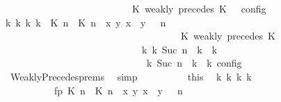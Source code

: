 \begin{isabellebody}
\ \ \ \ \ \ \ \ \ \ \ \ \ \ \ \ \ \ \ \ \ \ \ \ {\isasymturnstile}\ {\isasymPsi}\ {\isasymtriangleright}\ {\isacharparenleft}{\isacharparenleft}K\ weakly\ precedes\ K\ {\isacharhash}\ {\isasymPhi}{\isacharparenright}\ {\isasymrbrakk}\isactrlsub c\isactrlsub o\isactrlsub n\isactrlsub f\isactrlsub i\isactrlsub g{\isacartoucheclose}\isanewline
\ \ \ \ \ \ \ \ \isamarkupfalse%
\ {\isacartoucheopen}{\isasymexists}{\isasymGamma}\isactrlsub k\ {\isasymPsi}\isactrlsub k\ {\isasymPhi}\isactrlsub k\ k{\isachardot}\ {\isacharparenleft}{\isacharparenleft}{\isacharparenleft}{\isacharparenleft}{\isasymlceil}{\isacharhash}\isactrlsup {\isasymle}\ K\ n{\isacharcomma}\ {\isacharhash}\isactrlsup {\isasymle}\ K\ n{\isasymrceil}\ {\isasymin}\ {\isacharparenleft}{\isasymlambda}{\isacharparenleft}x{\isacharcomma}\ y{\isacharparenright}{\isachardot}\ x\ {\isasymle}\ y{\isacharparenright}{\isacharparenright}\ {\isacharhash}\ {\isasymGamma}{\isacharparenright}{\isacharcomma}\ n\isanewline
\ \ \ \ \ \ \ \ \ \ \ \ \ \ \ \ \ \ \ \ \ \ \ \ \ \ \ \ \ \ \ \ \ \ {\isasymturnstile}\ {\isasymPsi}\ {\isasymtriangleright}\ {\isacharparenleft}{\isacharparenleft}K\ weakly\ precedes\ K\ {\isacharhash}\ {\isasymPhi}{\isacharparenright}{\isacharparenright}\isanewline
\ \ \ \ \ \ \ \ \ \ \ \ \ \ \ \ \ \ \ \ \ \ \ \ \ \ \ \ \ {\isasymhookrightarrow}\isactrlbsup k\isactrlesup \ {\isacharparenleft}{\isasymGamma}\isactrlsub k{\isacharcomma}\ Suc\ n\ {\isasymturnstile}\ {\isasymPsi}\isactrlsub k\ {\isasymtriangleright}\ {\isasymPhi}\isactrlsub k{\isacharparenright}{\isacharparenright}\isanewline
\ \ \ \ \ \ \ \ \ \ \ \ \ \ \ \ \ \ \ \ \ \ \ \ \ \ {\isasymand}\ {\isacharparenleft}{\isasymrho}\ {\isasymin}\ {\isasymlbrakk}\ {\isasymGamma}\isactrlsub k{\isacharcomma}\ Suc\ n\ {\isasymturnstile}\ {\isasymPsi}\isactrlsub k\ {\isasymtriangleright}\ {\isasymPhi}\isactrlsub k\ {\isasymrbrakk}\isactrlsub c\isactrlsub o\isactrlsub n\isactrlsub f\isactrlsub i\isactrlsub g{\isacharparenright}{\isacartoucheclose}\isanewline
\ \ \ \ \ \ \ \ \ \ \isamarkupfalse%
\ \ WeaklyPrecedes{\isachardot}prems\ \isamarkupfalse%
\ simp\isanewline
\ \ \ \ \ \ \ \ \isamarkupfalse%
\ this\ \isamarkupfalse%
\ {\isasymGamma}\isactrlsub k\ {\isasymPsi}\isactrlsub k\ {\isasymPhi}\isactrlsub k\ k\isanewline
\ \ \ \ \ \ \ \ \ \ \ fp{\isacharcolon}{\isacartoucheopen}{\isacharparenleft}{\isacharparenleft}{\isacharparenleft}{\isasymlceil}{\isacharhash}\isactrlsup {\isasymle}\ K\ n{\isacharcomma}\ {\isacharhash}\isactrlsup {\isasymle}\ K\ n{\isasymrceil}\ {\isasymin}\ {\isacharparenleft}{\isasymlambda}{\isacharparenleft}x{\isacharcomma}\ y{\isacharparenright}{\isachardot}\ x\ {\isasymle}\ y{\isacharparenright}{\isacharparenright}\ {\isacharhash}\ {\isasymGamma}{\isacharparenright}{\isacharcomma}\ n\isanewline

\end{isabellebody}

